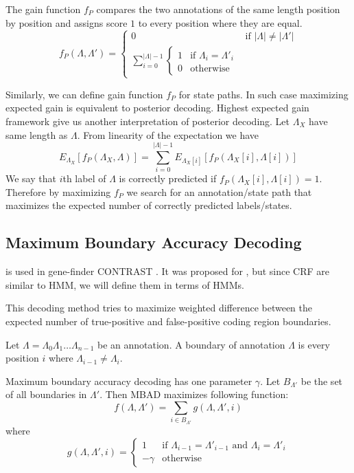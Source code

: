 The gain function $f_P$ compares the two annotations of the same length position
by position and assigns score $1$ to every position where they are equal.
\begin{equation}
f_P(\Lambda,\Lambda') = 
\begin{cases}
0 & \text{if $|\Lambda|\not=|\Lambda'|$}\\
\sum_{i=0}^{|\Lambda|-1}\begin{cases}
1 & \text{if $\Lambda_i=\Lambda'_i$}\\
0 & \text{otherwise}
\end{cases}
\end{cases}
\end{equation}

Similarly, we can define gain function $f_P$ for state paths. In such case
maximizing expected gain is equivalent to posterior decoding. Highest expected
gain framework give us another interpretation of posterior decoding. Let
$\Lambda_X$  have same length as $\Lambda$. From linearity of the expectation we
have
\[E_{\Lambda_X}[f_P(\Lambda_X,\Lambda)] =
\sum_{i=0}^{|\Lambda|-1}E_{\Lambda_X[i]}[f_P(\Lambda_X[i],\Lambda[i])]\]
We say that $i$th label of $\Lambda$ is correctly predicted if $f_P(\Lambda_X[i],\Lambda[i])=1$. Therefore  
by maximizing $f_P$ we search for an annotation/state path that maximizes the
expected number of correctly predicted labels/states.

\subsection{Maximum Boundary Accuracy Decoding}

 is used in gene-finder
CONTRAST \cite{Gross2007}. It
was proposed for , but since CRF
are similar to HMM, we will define them in terms of HMMs.

This decoding method tries to maximize weighted difference between the expected
number of true-positive and false-positive coding region boundaries.

\begin{definition}
Let $\Lambda=\Lambda_0\Lambda_1\dots\Lambda_{n-1}$ be an annotation. A boundary of
annotation $\Lambda$ is every position $i$ where $\Lambda_{i-1}\not=\Lambda_i$. 
\end{definition}

Maximum boundary accuracy decoding has one parameter $\gamma$. Let $B_{\Lambda'}$ be the
set of all boundaries in $\Lambda'$. Then MBAD maximizes following function:
\begin{equation}
f(\Lambda,\Lambda')=\sum_{i\in B_{\Lambda'}}g(\Lambda,\Lambda',i)
\end{equation}
where 
\begin{equation}
g(\Lambda,\Lambda',i)=
\begin{cases}
1 & \text{if $\Lambda_{i-1}=\Lambda'_{i-1}$ and $\Lambda_{i}=\Lambda'_{i}$}\\
-\gamma& \text{otherwise}
\end{cases}
\end{equation}

